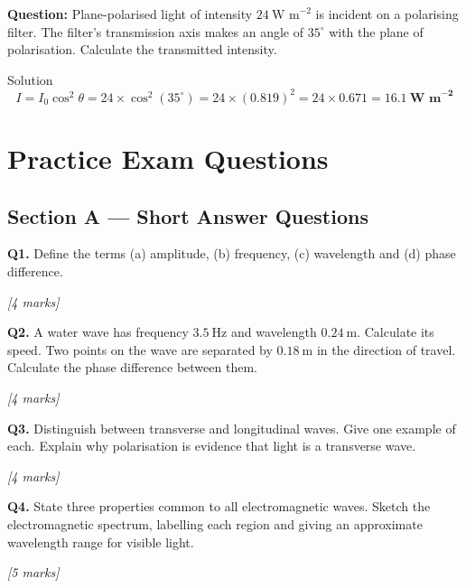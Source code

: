 \textbf{Question:} Plane-polarised light of intensity $24\ \text{W m}^{-2}$ is incident on a polarising filter. The filter's transmission axis makes an angle of $35^\circ$ with the plane of polarisation. Calculate the transmitted intensity.

\begin{examplebox}{Solution}
$$I = I_0\cos^2\theta = 24 \times \cos^2(35^\circ) = 24 \times (0.819)^2 = 24 \times 0.671 = \mathbf{16.1\ \text{W m}^{-2}}$$
\end{examplebox}

\section{Practice Exam Questions}

\subsection*{Section A --- Short Answer Questions}

\begin{tcolorbox}[colback=white, colframe=midblue, breakable]

\begin{minipage}{\linewidth}
\textbf{Q1.} Define the terms (a) amplitude, (b) frequency, (c) wavelength and (d) phase difference.
\par\hfill\textit{[4 marks]}
\vspace{4cm}
\end{minipage}

\begin{minipage}{\linewidth}
\textbf{Q2.} A water wave has frequency $3.5\ \text{Hz}$ and wavelength $0.24\ \text{m}$. Calculate its speed. Two points on the wave are separated by $0.18\ \text{m}$ in the direction of travel. Calculate the phase difference between them.
\par\hfill\textit{[4 marks]}
\vspace{4cm}
\end{minipage}

\begin{minipage}{\linewidth}
\textbf{Q3.} Distinguish between transverse and longitudinal waves. Give one example of each. Explain why polarisation is evidence that light is a transverse wave.
\par\hfill\textit{[4 marks]}
\vspace{8cm}
\end{minipage}

\begin{minipage}{\linewidth}
\textbf{Q4.} State three properties common to all electromagnetic waves. Sketch the electromagnetic spectrum, labelling each region and giving an approximate wavelength range for visible light.
\par\hfill\textit{[5 marks]}
\vspace{12cm}
\end{minipage}

\end{tcolorbox}

